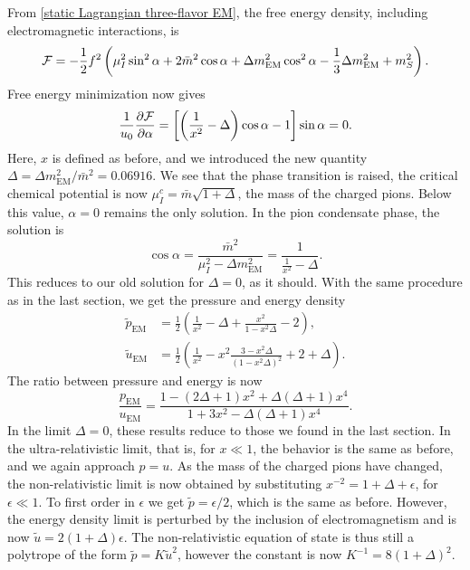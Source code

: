 From \autoref{static Lagrangian three-flavor EM}, the free energy density, including electromagnetic interactions, is
%
\begin{equation}
    \mathcal{F} =
    - \frac{1}{2} f^2
    \left(
        \mu_I^2 \sin^2\alpha + 2 \bar m^2\cos\alpha 
        + \Delta m_\text{EM}^2\cos^2\alpha
        - \frac{1}{3}\Delta m_\text{EM}^2 + m_S^2
    \right).
\end{equation}
%
Free energy minimization now gives
%
\begin{equation}
    \frac{1}{u_0}\pdv{\mathcal{F}}{\alpha}
    = 
    \left[ \left( \frac{1}{x^2} - \Delta \right) \cos \alpha - 1\right] \sin \alpha = 0.
\end{equation}
%
Here, $x$ is defined as before, and we introduced the new quantity $\Delta = \Delta m_{\text{EM}}^2 / \bar m^2= 0.06916$.
We see that the phase transition is raised, the critical chemical potential is now $\mu_I^c = \bar m \sqrt{1 + \Delta}$, the mass of the charged pions.
Below this value, $\alpha = 0$ remains the only solution.
In the pion condensate phase, the solution is
%
\begin{equation}
    \cos \alpha = \frac{\bar m^2}{\mu_I^2 - \Delta m_\text{EM}^2}
    = \frac{1}{\frac{1}{x^2} -  \Delta}.
\end{equation}
%
This reduces to our old solution for $\Delta = 0$, as it should.
With the same procedure as in the last section, we get the pressure and energy density
%
\begin{align}
    \label{pressure with em interaction}
    \tilde p_\text{EM}
    & = \frac{1}{2} 
    \left(
        \frac{1}{x^2} - \Delta
        + \frac{x^2}{1 - x^2 \Delta} 
        - 2 
    \right), \\
    \tilde u_\text{EM}
    &= \frac{1}{2} 
    \left(
        \frac{1}{x^2} 
        - x^2 \frac{3 - x^2 \Delta }{(1 - x^2 \Delta)^2}
        + 2 + \Delta
    \right).
\end{align}
%
The ratio between pressure and energy is now
%
\begin{equation}
    \frac{p_\text{EM}}{u_\text{EM}} 
    = 
    \frac{
        1 - (2\Delta + 1)x^2 + \Delta(\Delta + 1)x^4
        }{
        1 + 3x^2 - \Delta (\Delta +1)x^4
        }.
\end{equation}
%
In the limit $\Delta = 0$, these results reduce to those we found in the last section.
In the ultra-relativistic limit, that is, for  $x \ll 1$, the behavior is the same as before, and we again approach $p = u$.
As the mass of the charged pions have changed, the non-relativistic limit is now obtained by substituting $x^{-2} = 1 + \Delta + \epsilon$, for $\epsilon \ll 1$.
To first order in $\epsilon$ we get $\tilde p = \epsilon / 2$, which is the same as before.
However, the energy density limit is perturbed by the inclusion of electromagnetism and is now $\tilde u = 2(1 + \Delta) \epsilon$.
The non-relativistic equation of state is thus still a polytrope of the form $\tilde p = K \tilde u^2$, however the constant is now $K^{-1} = 8 (1+\Delta)^2$.


